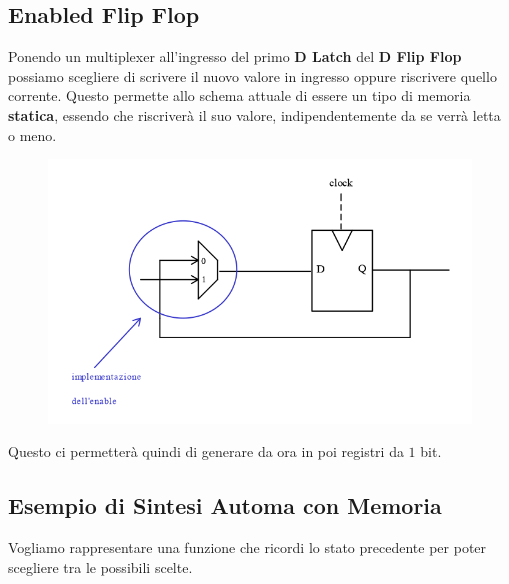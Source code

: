 \documentclass{article}
\begin{document}
\newpage

\subsection{Enabled Flip Flop}

Ponendo un multiplexer all'ingresso del primo \textbf{D Latch} del \textbf{D Flip Flop}
possiamo scegliere di scrivere il nuovo valore in ingresso oppure riscrivere quello corrente. Questo permette allo schema attuale di essere un tipo di memoria \textbf{statica}, essendo che riscriverà il suo valore, indipendentemente da se verrà letta o meno.

\begin{figure}[htbp]
    \includegraphics[scale=0.45]{img/enabledFlipFlop.png}
    \centering
\end{figure}

Questo ci permetterà quindi di generare da ora in poi registri da $1$ bit.

\vspace*{20px}

\subsection{Esempio di Sintesi Automa con Memoria}

Vogliamo rappresentare una funzione che ricordi lo stato precedente per poter scegliere tra le possibili scelte.

\vspace*{15px}
\end{document}
